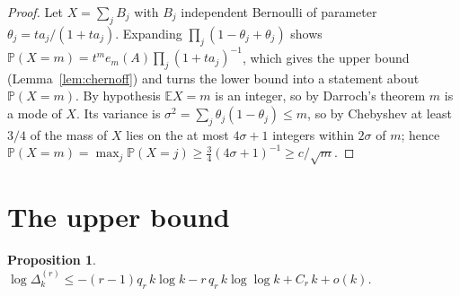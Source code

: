 \documentclass[10pt,a4paper]{amsart}
\newtheorem{proposition}[theorem]{Proposition}
\numberwithin{equation}{section}
\begin{document}
\begin{proof}
Let $X=\sum_jB_j$ with $B_j$ independent Bernoulli of parameter
$\theta_j=ta_j/(1+ta_j)$. Expanding $\prod_j(1-\theta_j+\theta_j)$ shows
$\mathbb P(X=m)=t^{m}e_m(A)\prod_j(1+ta_j)^{-1}$, which gives the upper bound
(Lemma~\ref{lem:chernoff}) and turns the lower bound into a statement about
$\mathbb P(X=m)$. By hypothesis $\mathbb E X=m$ is an integer, so by Darroch's theorem $m$
is a mode of $X$. Its variance is $\sigma^{2}=\sum_j\theta_j(1-\theta_j)\le m$, so by
Chebyshev at least $3/4$ of the mass of $X$ lies on the at most $4\sigma+1$ integers within
$2\sigma$ of $m$; hence $\mathbb P(X=m)=\max_j\mathbb P(X=j)\ge\frac34(4\sigma+1)^{-1}\ge
c/\sqrt m$.
\end{proof}

\section{The upper bound}\label{sec:upper}

\begin{proposition}\label{prop:upper}
$\log\Delta^{(r)}_k\le-(r-1)q_r\,k\log k-r\,q_r\,k\log\log k+C_r\,k+o(k)$.
\end{proposition}
\end{document}
